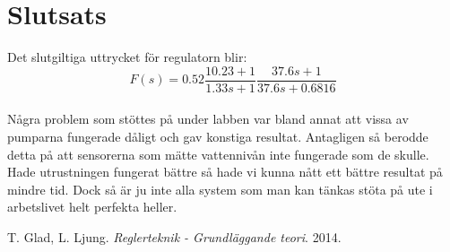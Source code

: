 \documentclass[a4paper]{article}
\begin{document}
\section{Slutsats}

Det slutgiltiga uttrycket för regulatorn blir:
\\
\begin{equation*}
  F(s)=0.52\frac{10.23+1}{1.33s+1} \frac{37.6s+1}{37.6s+0.6816}
\end{equation*}
\\

Några problem som stöttes på under labben var bland annat att vissa av pumparna fungerade dåligt och gav konstiga resultat.
Antagligen så berodde detta på att sensorerna som mätte vattennivån inte fungerade som de skulle.
Hade utrustningen fungerat bättre så hade vi kunna nått ett bättre resultat på mindre tid.
Dock så är ju inte alla system som man kan tänkas stöta på ute i arbetslivet helt perfekta heller. 

\begin{thebibliography}{9}
    T. Glad, L. Ljung. 
    \emph{Reglerteknik - Grundläggande teori}.
    2014.
\end{thebibliography}
\end{document}
